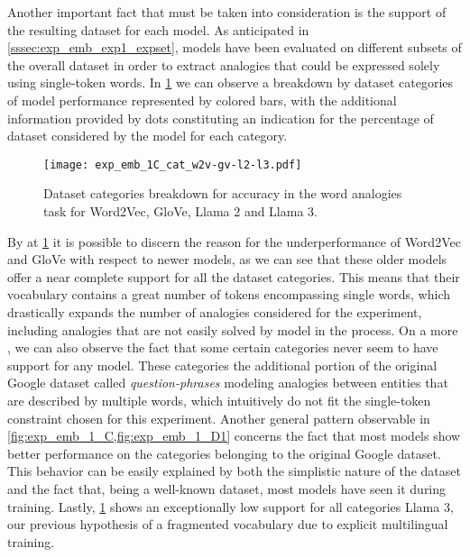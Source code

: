 Another important fact that must be taken into consideration is the support of the resulting dataset for each model.
As anticipated in \cref{sssec:exp_emb_exp1_expset}, models have been evaluated on different subsets of the overall dataset in order to extract analogies that could be expressed solely using single-token words.
In \cref{fig:exp_emb_1_C} we can observe a breakdown by dataset categories of model performance represented by colored bars, with the additional information provided by dots constituting an indication for the percentage of dataset considered by the model for each category.

\begin{figure}[t!]
    \centering
    \texttt{[image: exp\_emb\_1C\_cat\_w2v-gv-l2-l3.pdf]}
    \caption{Dataset categories breakdown for accuracy in the word analogies task for Word2Vec, GloVe, Llama 2 and Llama 3.}
    \label{fig:exp_emb_1_C}
\end{figure}

By  at \cref{fig:exp_emb_1_C} it is possible to discern the reason for the underperformance of Word2Vec and GloVe with respect to newer models, as we can see that these older models offer a near complete support for all the dataset categories.
This means that their vocabulary contains a great number of tokens encompassing single words, which drastically expands the number of analogies considered for the experiment, including analogies that are not easily solved by model in the process.
On a more , we can also observe the fact that some certain categories never seem to have support for any model.
These categories  the additional portion of the original Google dataset called \emph{question-phrases} modeling analogies between entities that are described by multiple words, which intuitively do not fit the single-token constraint chosen for this experiment.
Another general pattern observable in \cref{fig:exp_emb_1_C,fig:exp_emb_1_D1} concerns the fact that most models show better performance on the categories belonging to the original Google dataset.
This behavior can be easily explained by both the simplistic nature of the dataset and the fact that, being a well-known dataset, most models have seen it during training.
Lastly, \cref{fig:exp_emb_1_C} shows an exceptionally low support for all categories  Llama 3,  our previous hypothesis of a fragmented vocabulary due to explicit multilingual training.

